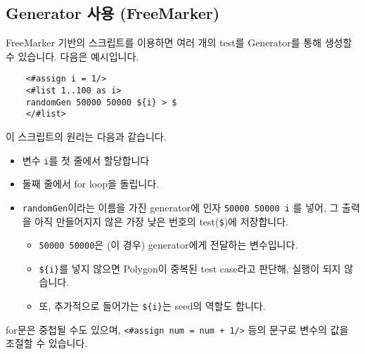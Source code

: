\documentclass{article}
\begin{document}
    \subsection{Generator 사용 (FreeMarker)}
    FreeMarker 기반의 스크립트를 이용하면 여러 개의 test를 Generator를 통해 생성할 수 있습니다. 다음은 예시입니다.
    \begin{verbatim}
    <#assign i = 1/>
    <#list 1..100 as i>
    randomGen 50000 50000 ${i} > $
    </#list>\end{verbatim}
    이 스크립트의 원리는 다음과 같습니다.
    \begin{itemize}
        \item 변수 \verb|i|를 첫 줄에서 할당합니다
        \item 둘째 줄에서 for loop을 돌립니다.
        \item \verb|randomGen|이라는 이름을 가진 generator에 인자 \verb|50000 50000 i| 를 넣어, 그 출력을 아직 만들어지지 않은 가장 낮은 번호의 test(\verb|$|)에 저장합니다.
        \begin{itemize}
            \item \verb|50000 50000|은 (이 경우) generator에게 전달하는 변수입니다.
            \item \verb|${i}|를 넣지 않으면 Polygon이 중복된 test case라고 판단해, 실행이 되지 않습니다.
            \item  또, 추가적으로 들어가는 \verb|${i}|는 seed의 역할도 합니다.
        \end{itemize}
    \end{itemize}
    for문은 중첩될 수도 있으며, \verb|<#assign num = num + 1/>| 등의 문구로 변수의 값을 조절할 수 있습니다.
\end{document}
